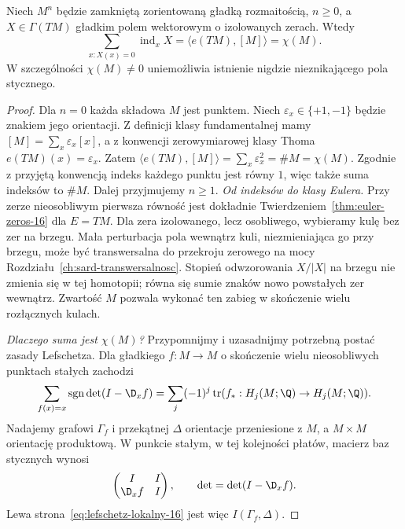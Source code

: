 \begin{twierdzenie}
\label{thm:poincare-hopf-16}
Niech $M^n$ będzie zamkniętą zorientowaną gładką
rozmaitością, $n\geq0$, a
$X\in\Gamma(TM)$ gładkim polem wektorowym
o izolowanych zerach. Wtedy
\begin{equation}\label{eq:poincare-hopf-16}
 \sum_{x:X(x)=0}
     \operatorname{ind}_x X
 =\langle e(TM),[M]\rangle
 =\chi(M).
\end{equation}
W szczególności
$\chi(M)\ne0$
uniemożliwia istnienie
nigdzie nieznikającego
pola stycznego.
\end{twierdzenie}
\begin{proof}
Dla $n=0$ każda składowa $M$ jest punktem.
Niech $\varepsilon_x\in\{+1,-1\}$ będzie znakiem jego
orientacji. Z definicji klasy fundamentalnej mamy
$[M]=\sum_x\varepsilon_x[x]$, a z konwencji
zerowymiarowej klasy Thoma
$e(TM)(x)=\varepsilon_x$. Zatem
$\langle e(TM),[M]\rangle
=\sum_x\varepsilon_x^2=\#M=\chi(M)$.
Zgodnie z przyjętą konwencją indeks każdego punktu
jest równy $1$, więc także suma indeksów to $\#M$.
Dalej przyjmujemy $n\geq1$.
\emph{Od indeksów do klasy Eulera.}
Przy zerze nieosobliwym
pierwsza równość jest
dokładnie
Twierdzeniem~\ref{thm:euler-zeros-16}
dla $E=TM$. Dla zera
izolowanego, lecz
osobliwego, wybieramy
kulę bez zer na
brzegu. Mała perturbacja
pola wewnątrz kuli,
niezmieniająca go
przy brzegu, może być
transwersalna do
przekroju zerowego
na mocy
Rozdziału~\ref{ch:sard-transwersalnosc}.
Stopień odwzorowania
$X/|X|$ na brzegu
nie zmienia się
w tej homotopii;
równa się sumie
znaków nowo
powstałych zer
wewnątrz. Zwartość
$M$ pozwala wykonać
ten zabieg w
skończenie wielu
rozłącznych kulach.

\emph{Dlaczego suma jest $\chi(M)$?}
Przypomnijmy i uzasadnijmy
potrzebną postać
zasady Lefschetza.
Dla gładkiego
$f:M\to M$ o
skończenie wielu
nieosobliwych
punktach stałych
zachodzi
\begin{equation}\label{eq:lefschetz-lokalny-16}
 \sum_{f(x)=x}
    \operatorname{sgn}\det(I-\D_xf)
 =\sum_j(-1)^j
    \operatorname{tr}
      (f_*:H_j(M;\Q)\to H_j(M;\Q)).
\end{equation}
Nadajemy grafowi $\Gamma_f$ i przekątnej $\Delta$
orientacje przeniesione z $M$, a $M\times M$ orientację
produktową. W punkcie stałym, w tej kolejności płatów,
macierz baz stycznych wynosi
\[
 \begin{pmatrix}I&I\\\D_xf&I\end{pmatrix},
 \qquad \det=\det(I-\D_xf).
\]
Lewa strona~\eqref{eq:lefschetz-lokalny-16}
jest więc $I(\Gamma_f,\Delta)$.


\end{proof}
